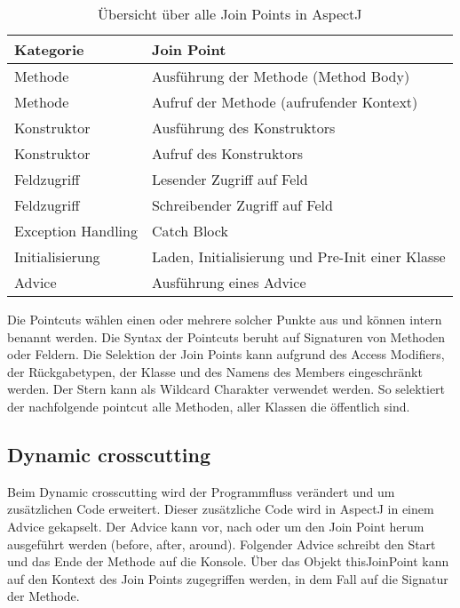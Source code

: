 \begin{table}[H]
	\centering
		\begin{tabular}{p{} p{}} \toprule
			\textbf{Kategorie} & \textbf{Join Point} \\ \midrule
			Methode & Ausführung der Methode (Method Body) \\ \midrule
			Methode & Aufruf der Methode (aufrufender Kontext) \\ \midrule
			Konstruktor & Ausführung des Konstruktors \\ \midrule
			Konstruktor & Aufruf des Konstruktors \\ \midrule
			Feldzugriff & Lesender Zugriff auf Feld \\ \midrule
			Feldzugriff & Schreibender Zugriff auf Feld \\ \midrule
			Exception Handling & Catch Block \\ \midrule
			Initialisierung & Laden, Initialisierung und Pre-Init einer Klasse \\ \midrule
			Advice & Ausführung eines Advice
			 \\ \bottomrule
		\end{tabular}
	\caption{Übersicht über alle Join Points in AspectJ}
	\label{tab:overview}
\end{table}

Die Pointcuts wählen einen oder mehrere solcher Punkte aus und können intern benannt werden. Die Syntax der Pointcuts beruht auf Signaturen von Methoden oder Feldern. Die Selektion der Join Points kann aufgrund des Access Modifiers, der Rückgabetypen, der Klasse und des Namens des Members eingeschränkt werden. Der Stern kann als Wildcard Charakter verwendet werden. So selektiert der nachfolgende pointcut alle Methoden, aller Klassen die öffentlich sind.



\subsection{Dynamic crosscutting}
Beim Dynamic crosscutting wird der Programmfluss verändert und um zusätzlichen Code erweitert. Dieser zusätzliche Code wird in AspectJ in einem Advice gekapselt. Der Advice kann vor, nach oder um den Join Point herum ausgeführt werden (before, after, around). Folgender Advice schreibt den Start und das Ende der Methode auf die Konsole. Über das Objekt thisJoinPoint kann auf den Kontext des Join Points zugegriffen werden, in dem Fall auf die Signatur der Methode.

